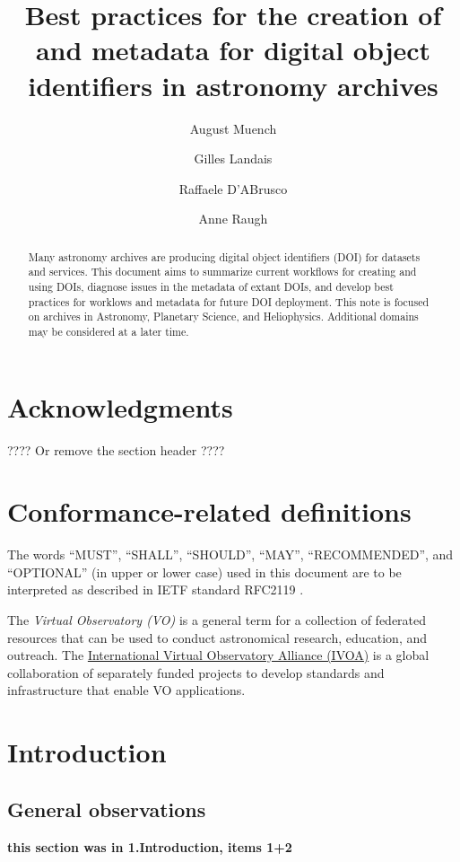 \documentclass[11pt,a4paper]{ivoa}
\title{Best practices for the creation of and metadata for digital object identifiers in astronomy archives}
\author[https://orcid.org/0000-0003-0666-6367]{August Muench}
\author[]{Gilles Landais}
\author[]{Raffaele D'ABrusco}
\author[]{Anne Raugh}
\begin{document}

\begin{abstract}
Many astronomy archives are producing digital object identifiers (DOI) for datasets and services.
This document aims to summarize current workflows for creating and using DOIs, 
diagnose issues in the metadata of extant DOIs, 
and develop best practices for worklows and metadata for future DOI deployment.
This note is focused on archives in Astronomy, Planetary Science, and Heliophysics. 
Additional domains may be considered at a later time.
\end{abstract}


\section*{Acknowledgments}

???? Or remove the section header ????

\section*{Conformance-related definitions}

The words ``MUST'', ``SHALL'', ``SHOULD'', ``MAY'', ``RECOMMENDED'', and
``OPTIONAL'' (in upper or lower case) used in this document are to be
interpreted as described in IETF standard RFC2119 \citep{std:RFC2119}.

The \emph{Virtual Observatory (VO)} is a general term for a collection of federated resources that can be used to conduct astronomical research, education, and outreach.
The \href{https://www.ivoa.net}{International Virtual Observatory Alliance (IVOA)} is a global collaboration of separately funded projects to develop standards and infrastructure that enable VO applications.


\section{Introduction}
\label{sec:intro}

\subsection{General observations} 
\textbf{\color{red} this section was in 1.Introduction, items 1+2}
\end{document}
